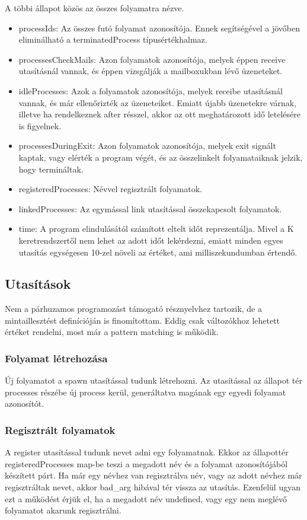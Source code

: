 \documentclass[]{article}
\begin{document}
A többi állapot közös az összes folyamatra nézve.

\begin{itemize}
\item processIds: Az összes futó folyamat azonosítója. Ennek segítségével a jövőben eliminálható a terminatedProcess típusértékhalmaz.
\item processesCheckMails: Azon folyamatok azonosítója, melyek éppen receive utasításnál vannak, és éppen vizsgálják a mailboxukban lévő üzeneteket.
\item idleProcesses: Azok a folyamatok azonosítója, melyek receibe utasításnál vannak, és már ellenőrizték az üzeneteiket. Emiatt újabb üzenetekre várnak, illetve ha rendelkeznek after résszel, akkor az ott meghatározott idő letelésére is figyelnek.
\item processesDuringExit: Azon folyamatok azonosítója, melyek exit signált kaptak, vagy elérték a program végét, és az összelinkelt folyamataiknak jelzik, hogy termináltak.
\item registeredProcesses: Névvel regisztrált folyamatok.
\item linkedProcesses: Az egymással link utasítással összekapcsolt folyamatok.
\item time: A program elindulásától számított eltelt időt reprezentálja. Mivel a K keretrendszertől nem lehet az adott időt lekérdezni, emiatt minden egyes utasítás egységesen 10-zel növeli az értéket, ami milliszekundumban értendő.
\end{itemize}


\subsection*{Utasítások}
Nem a párhuzamos programozást támogató résznyelvhez tartozik, de a mintaillesztést definícióján is finomítottam. Eddig csak változókhoz lehetett értéket rendelni, most már a pattern matching is működik.

\subsubsection*{Folyamat létrehozása}
Új folyamatot a spawn utasítással tudunk létrehozni. Az utasítással az állapot tér processes részébe új process kerül, generáltatva magának egy egyedi folyamat azonosítót.

\subsubsection*{Regisztrált folyamatok}
A register utasítással tudunk nevet adni egy folyamatnak. Ekkor az állapottér registeredProcesses map-be teszi a megadott név és a folyamat azonosítójából készített párt. Ha már egy névhez van regisztrálva név, vagy az adott névhez már regisztráltak nevet, akkor bad\_arg hibával tér vissza az utasítás. Ezenfelül ugyan ezt a működést érjük el, ha a megadott név undefined, vagy egy nem meglévő folyamatot akarunk regisztrálni.
\end{document}
